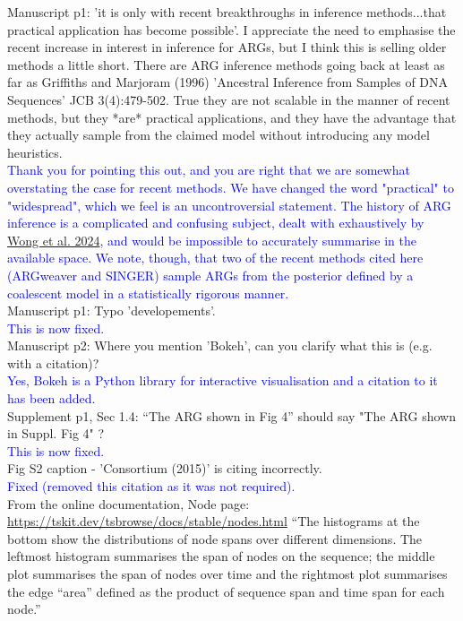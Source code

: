 \documentclass{article}
\begin{document}
Manuscript p1: 'it is only with recent breakthroughs in inference methods...that practical application 
has become possible'. I appreciate the need to emphasise the recent increase in interest in inference for ARGs, 
but I think this is selling older methods a little short. There are ARG inference methods going back at least 
as far as Griffiths and Marjoram (1996) 'Ancestral Inference from Samples of DNA Sequences' JCB 3(4):479-502. 
True they are not scalable in the manner of recent methods, but they *are* practical applications, and they have 
the advantage that they actually sample from the claimed model without introducing any model heuristics.\\
\textcolor{blue}{Thank you for pointing this out, and you are right that we are somewhat overstating the 
case for recent methods. We have changed the word "practical" to "widespread", which we feel is an uncontroversial 
statement. The history of ARG inference is a complicated and confusing subject, dealt with exhaustively by 
\href{https://academic.oup.com/genetics/article/228/1/iyae100/7714980}{Wong et al. 2024}, and would be impossible to accurately summarise in the available space. We note, though, 
that two of the recent methods cited here (ARGweaver and SINGER) sample ARGs from the posterior defined by a 
coalescent model in a statistically rigorous manner.}\\

Manuscript p1: Typo 'developements'.\\
\textcolor{blue}{This is now fixed.}\\

Manuscript p2: Where you mention 'Bokeh', can you clarify what this is (e.g. with a citation)?\\
\textcolor{blue}{Yes, Bokeh is a Python library for interactive visualisation and a citation to it 
has been added.}\\

Supplement p1, Sec 1.4: ``The ARG shown in Fig 4'' should say "The ARG shown in Suppl. Fig 4" ?\\
\textcolor{blue}{This is now fixed.}\\

Fig S2 caption - 'Consortium (2015)' is citing incorrectly.\\
\textcolor{blue}{Fixed (removed this citation as it was not required).}\\

From the online documentation, Node page: \url{https://tskit.dev/tsbrowse/docs/stable/nodes.html}
``The histograms at the bottom show the distributions of node spans over different dimensions. 
The leftmost histogram summarises the span of nodes on the sequence; the middle plot summarises 
the span of nodes over time and the rightmost plot summarises the edge “area” defined as the product 
of sequence span and time span for each node.''
\end{document}
